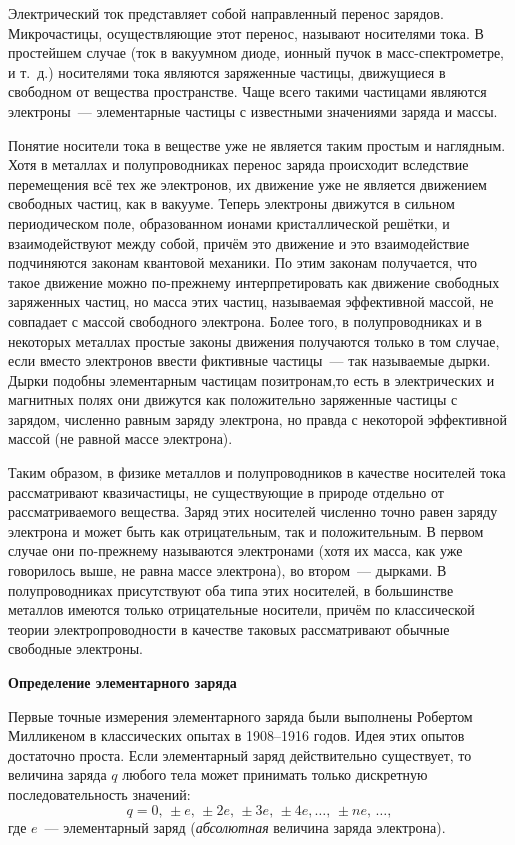 \documentclass[a4paper,10pt,twoside]{article}
\begin{document}
\vskip 9mm

Электрический ток представляет собой направленный перенос зарядов. Микрочастицы, осуществляющие этот перенос, называют {\textsf{носителями тока}}. В простейшем случае (ток в вакуумном диоде, ионный пучок в масс-спектрометре, и т.~д.) носителями тока являются заряженные частицы, движущиеся в свободном от вещества пространстве. Чаще всего такими частицами являются электроны~--- элементарные частицы с известными значениями заряда и массы.

Понятие \textsf{носители тока в веществе} уже не является таким простым и наглядным. Хотя в металлах и полупроводниках перенос заряда происходит вследствие перемещения всё тех же электронов, их движение уже не является движением свободных частиц, как в вакууме. Теперь электроны движутся в сильном периодическом поле, образованном ионами кристаллической решётки, и взаимодействуют между собой, причём это движение и это взаимодействие подчиняются законам квантовой механики. По этим законам получается, что такое движение можно по-прежнему интерпретировать как движение свободных заряженных частиц, но масса этих частиц, называемая эффективной массой, не совпадает с массой свободного электрона. Более того, в полупроводниках и в некоторых металлах простые законы движения получаются только в том случае, если вместо электронов ввести фиктивные частицы~--- так называемые \textsf{дырки}. Дырки подобны элементарным частицам позитронам,то есть в электрических и магнитных полях они движутся как положительно заряженные частицы с зарядом, численно равным заряду электрона, но правда с некоторой эффективной массой (не равной массе электрона).

Таким образом, в физике металлов и полупроводников в качестве носителей тока рассматривают квазичастицы, не существующие в природе отдельно от рассматриваемого вещества. Заряд этих носителей численно точно равен заряду электрона и может быть как отрицательным, так и положительным. В первом случае они по-прежнему называются электронами (хотя их масса, как уже говорилось выше, не равна массе электрона), во втором~--- дырками. В полупроводниках присутствуют оба типа этих носителей, в большинстве металлов имеются только отрицательные носители, причём по классической теории электропроводности в качестве таковых рассматривают обычные свободные электроны.

{\bf \Large Определение элементарного заряда}

Первые точные измерения элементарного заряда были выполнены Робертом Милликеном в классических опытах в 1908--1916 годов. Идея этих опытов достаточно проста. Если элементарный заряд действительно существует, то величина заряда $q$ любого тела может принимать только дискретную последовательность значений:
$$q = 0,\,\pm e,\,\pm2e,\,\pm3e,\,\pm4e, \ldots,\, \pm ne,\, \ldots,
$$
где $e$~--- элементарный заряд (\emph{абсолютная} величина заряда электрона).
\end{document}

